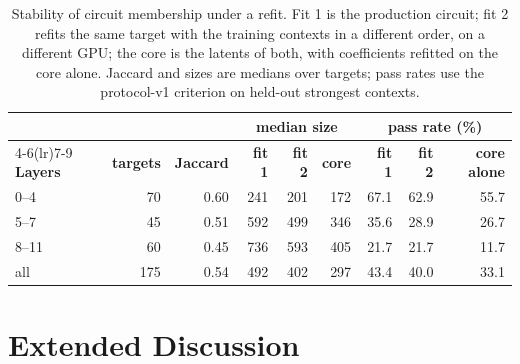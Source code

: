 \documentclass[10pt]{article}
\begin{document}
\begin{table}[h]
\centering
\small
\setlength{\tabcolsep}{5pt}
\begin{tabular}{lrrrrrrrr}
\toprule
& & & \multicolumn{3}{c}{\textbf{median size}} & \multicolumn{3}{c}{\textbf{pass rate (\%)}} \\
\cmidrule(lr){4-6}\cmidrule(lr){7-9}
\textbf{Layers} & \textbf{targets} & \textbf{Jaccard} & \textbf{fit 1} & \textbf{fit 2} & \textbf{core} & \textbf{fit 1} & \textbf{fit 2} & \textbf{core alone} \\
\midrule
0--4  & 70  & 0.60 & 241 & 201 & 172 & 67.1 & 62.9 & 55.7 \\
5--7  & 45  & 0.51 & 592 & 499 & 346 & 35.6 & 28.9 & 26.7 \\
8--11 & 60  & 0.45 & 736 & 593 & 405 & 21.7 & 21.7 & 11.7 \\
\midrule
all   & 175 & 0.54 & 492 & 402 & 297 & 43.4 & 40.0 & 33.1 \\
\bottomrule
\end{tabular}
\caption{Stability of circuit membership under a refit.
Fit 1 is the production circuit; fit 2 refits the same target with the training contexts in a different order, on a different GPU; the core is the latents of both, with coefficients refitted on the core alone.
Jaccard and sizes are medians over targets; pass rates use the protocol-v1 criterion on held-out strongest contexts.}
\label{tab:stable-core}
\end{table}

\section{Extended Discussion}
\label{app:discussion}
\end{document}
